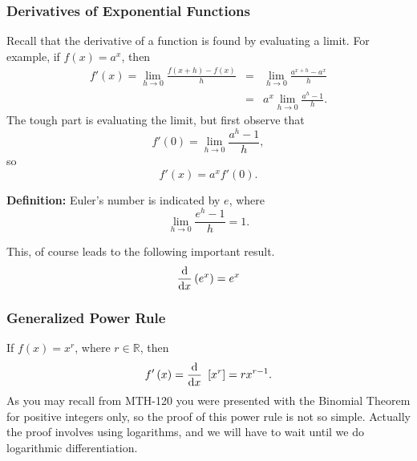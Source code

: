 \documentclass[12pt,addpoints, answers, fleqn]{exam}
\begin{document}
\subsubsection{Derivatives of Exponential Functions}

Recall that the derivative of a function is found by evaluating a limit. For example, if $f\left( x\right) = a^x$, then
\begin{eqnarray*}
f'\left( x \right) = \mathop {\lim }\limits_{h\to 0} \frac{f \left( x + h \right) - f \left( x \right)}{h} &=& \mathop {\lim }\limits_{h\to 0} \frac{a^{x+h} - a^x}{h}\\
&=& a^x \mathop {\lim }\limits_{h\to 0} \frac{a^{h} - 1}{h}.
\end{eqnarray*}
The tough part is evaluating the limit, but first observe that
\[
f'\left( 0 \right) = \mathop {\lim }\limits_{h\to 0} \frac{a^h - 1}{h},
\]
so
\[
f'\left( x \right) = a^x f'\left( 0 \right).
\]



\textbf{Definition:} Euler's number is indicated by $e$, where
\[
\mathop {\lim }\limits_{h\to 0} \frac{e^h - 1}{h} = 1.
\]

This, of course leads to the following important result.
\[
\frac{{\rm{d}}}{{\rm{d}}x} \left( e^x \right) = e^x
\]











\subsubsection{Generalized Power Rule}
If $f\left( x \right) = x^r$, where $r \in \mathbb{R}$, then
\[
f' \left( x \right) = \frac{{\rm{d}}}{{\rm{d}}x} \ \left[ x^r \right] = rx^{r-1}.
\]
As you may recall from MTH-120 you were presented with the Binomial Theorem for positive integers only, so the proof of this power rule is not so simple. Actually the proof involves using logarithms, and we will have to wait until we do logarithmic differentiation.
\end{document}
